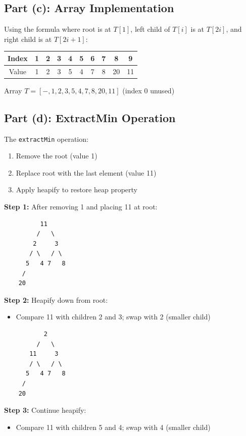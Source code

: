 \documentclass[12pt,a4paper]{article}
\begin{document}
\subsection{Part (c): Array Implementation}

Using the formula where root is at $T[1]$, left child of $T[i]$ is at $T[2i]$, and right child is at $T[2i+1]$:

\begin{center}
\begin{tabular}{|c|c|c|c|c|c|c|c|c|c|}
\hline
Index & 1 & 2 & 3 & 4 & 5 & 6 & 7 & 8 & 9 \\
\hline
Value & 1 & 2 & 3 & 5 & 4 & 7 & 8 & 20 & 11 \\
\hline
\end{tabular}
\end{center}

Array $T = [-, 1, 2, 3, 5, 4, 7, 8, 20, 11]$ (index 0 unused)

\subsection{Part (d): ExtractMin Operation}

The \texttt{extractMin} operation:
\begin{enumerate}
    \item Remove the root (value 1)
    \item Replace root with the last element (value 11)
    \item Apply heapify to restore heap property
\end{enumerate}

\textbf{Step 1:} After removing 1 and placing 11 at root:
\begin{verbatim}
          11
         /   \
        2     3
       / \   / \
      5   4 7   8
     / 
    20
\end{verbatim}

\textbf{Step 2:} Heapify down from root:
\begin{itemize}
    \item Compare 11 with children 2 and 3; swap with 2 (smaller child)
\end{itemize}

\begin{verbatim}
           2
         /   \
       11     3
       / \   / \
      5   4 7   8
     / 
    20
\end{verbatim}

\textbf{Step 3:} Continue heapify:
\begin{itemize}
    \item Compare 11 with children 5 and 4; swap with 4 (smaller child)
\end{itemize}
\end{document}
